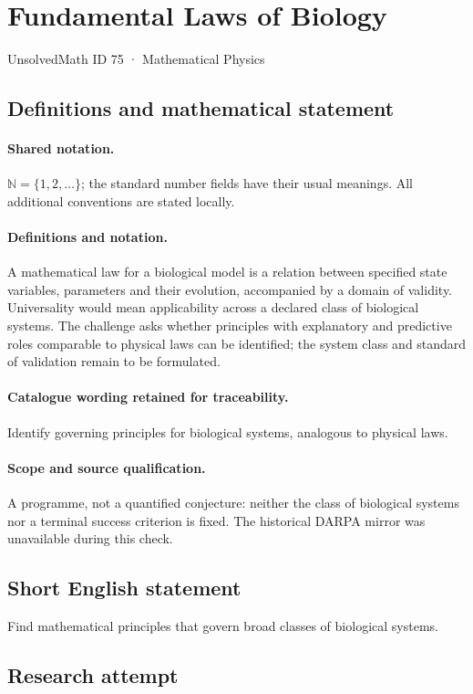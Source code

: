 \documentclass[11pt]{article}
\begin{document}
\setcounter{section}{74}
\section{Fundamental Laws of Biology}\label{75}
{\small UnsolvedMath ID 75 · Mathematical Physics}
\subsection{Definitions and mathematical statement}

\paragraph{Shared notation.}$\mathbb N=\{1,2,\ldots\}$; the standard number fields have their usual meanings. All additional conventions are stated locally.


\paragraph{Definitions and notation.}A mathematical law for a biological model is a relation between specified state variables, parameters and their evolution, accompanied by a domain of validity. Universality would mean applicability across a declared class of biological systems. The challenge asks whether principles with explanatory and predictive roles comparable to physical laws can be identified; the system class and standard of validation remain to be formulated.

\paragraph{Catalogue wording retained for traceability.}
Identify governing principles for biological systems, analogous to physical laws.
\paragraph{Scope and source qualification.}A programme, not a quantified conjecture: neither the class of biological systems nor a terminal success criterion is fixed. The historical DARPA mirror was unavailable during this check.
\subsection{Short English statement}
Find mathematical principles that govern broad classes of biological systems.
\subsection{Research attempt}
\end{document}
